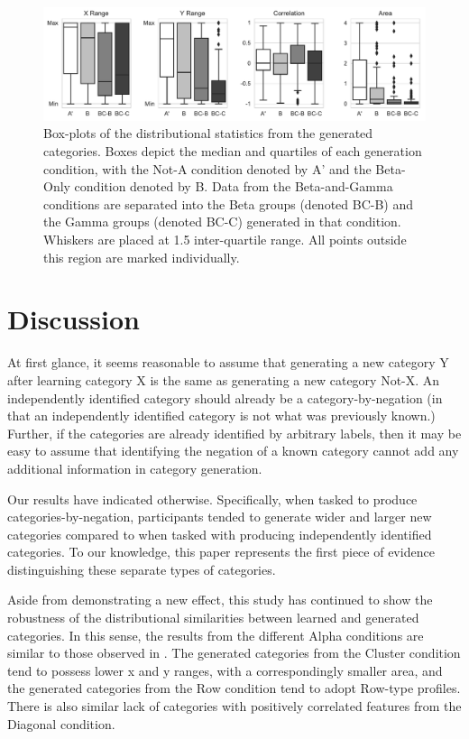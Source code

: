 \documentclass[10pt,letterpaper]{article}
\begin{document}
\begin{figure}%
\begin{center}
    \includegraphics[width=\textwidth]{Figures/stats_instr.pdf}
\end{center}
\caption{Box-plots of the distributional statistics from the generated categories. Boxes depict the median and quartiles of each generation condition, with the Not-A condition denoted by A' and the Beta-Only condition denoted by B. Data from the Beta-and-Gamma conditions are separated into the Beta groups (denoted BC-B) and the Gamma groups (denoted BC-C) generated in that condition. Whiskers are placed at 1.5 inter-quartile range. All points outside this region are marked individually.} 
\label{fig:stats_instr}
\end{figure}

\section{Discussion}
At first glance, it seems reasonable to assume that generating a new category Y after learning category X is the same as generating a new category Not-X. An independently identified category should already be a category-by-negation (in that an independently identified category is not what was previously known.) Further, if the categories are already identified by arbitrary labels, then it may be easy to assume that identifying the negation of a known category cannot add any additional information in category generation.  

Our results have indicated otherwise. Specifically, when tasked to produce categories-by-negation, participants tended to generate wider and larger new categories compared to when tasked with producing independently identified categories. To our knowledge, this paper represents the first piece of evidence distinguishing these separate types of categories. 

Aside from demonstrating a new effect, this study has continued to show the robustness of the distributional similarities between learned and generated categories. In this sense, the results from the different Alpha conditions are similar to those observed in \cite{austerweil2018catgen}. The generated categories from the Cluster condition tend to possess lower x and y ranges, with a correspondingly smaller area, and the generated categories from the Row condition tend to adopt Row-type profiles. There is also similar lack of categories with positively correlated features from the Diagonal condition.  
\end{document}
